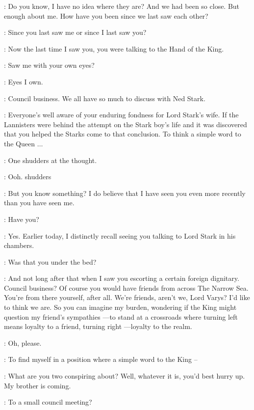 \VARYS: Do you know, I have no idea where they are? And we had been so close. But enough about me. How have you been since we last saw each other? 

\LITTLEFINGER: Since you last saw me or since I last saw you? 

\VARYS: Now the last time I saw you, you were talking to the Hand of the King. 

\LITTLEFINGER: Saw me with your own eyes? 

\VARYS: Eyes I own. 

\LITTLEFINGER: Council business. We all have so much to discuss with Ned Stark. 

\VARYS: Everyone's well aware of your enduring fondness for Lord Stark's wife. If the Lannisters were behind the attempt on the Stark boy's life and it was discovered that you helped the Starks come to that conclusion. To think a simple word to the Queen $\ldots$ 

\LITTLEFINGER: One shudders at the thought. 

\VARYS: Ooh. shudders 

\LITTLEFINGER: But you know something? I do believe that I have seen you even more recently than you have seen me. 

\VARYS: Have you? 

\LITTLEFINGER: Yes. Earlier today, I distinctly recall seeing you talking to Lord Stark in his chambers. 

\VARYS: Was that you under the bed? 

\LITTLEFINGER: And not long after that when I saw you escorting a certain foreign dignitary. Council business? Of course you would have friends from across The Narrow Sea. You're from there yourself, after all. We're friends, aren't we, Lord Varys? I'd like to think we are. So you can imagine my burden, wondering if the King might question my friend's sympathies ---to stand at a crossroads where turning left means loyalty to a friend, turning right ---loyalty to the realm. 

\VARYS: Oh, please. 

\LITTLEFINGER: To find myself in a position where a simple word to the King -- 


\RENLY: What are you two conspiring about? Well, whatever it is, you'd best hurry up. My brother is coming.  

\LITTLEFINGER: To a small council meeting? 


